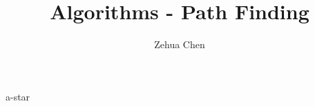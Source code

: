 \documentclass{../../../shared/latex/notes}
\title{Algorithms - Path Finding}
\author{Zehua Chen}
\begin{document}
  \maketitle
  \tableofcontents

  {a-star}
\end{document}

